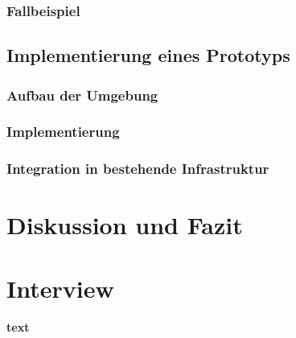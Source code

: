 \documentclass[a4paper, 12pt, oneside]{scrbook}
\begin{document}
		\subsection{Fallbeispiel}
	
	\section{Implementierung eines Prototyps}
	
		\subsection{Aufbau der Umgebung}
		
		\subsection{Implementierung}
		
			
		
		\subsection{Integration in bestehende Infrastruktur}
			

	
	
	\chapter{Diskussion und Fazit}\label{ch:Diskussion_Fazit}
	
	
	
	
	\frontmatter
	\printbibliography

	\chapter*{Interview}
	
	\textbf{text}
\end{document}
